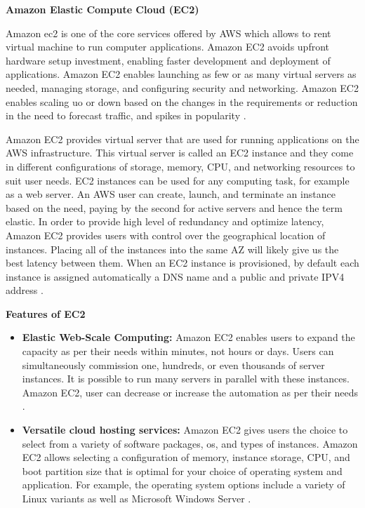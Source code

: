 \textbf{Amazon Elastic Compute Cloud (EC2)}

\par Amazon \gls{ec2} is one of the core services offered by
AWS
which
allows to rent virtual machine to run computer
applications. Amazon EC2 avoids upfront hardware setup investment, enabling faster development and deployment of applications. Amazon EC2 enables launching as few or as many virtual servers as needed, managing storage, and configuring security and networking. Amazon EC2 enables scaling uo or down based on the changes in the requirements or reduction in the need to forecast traffic, and spikes in popularity \cite{29}.

\par Amazon EC2 provides virtual server that are used for
running applications on the AWS infrastructure. This
virtual server is called an EC2 instance and they come in different configurations of storage, memory, CPU, and networking resources to suit user needs. EC2 instances can be used for any computing task, for example as a web server. An AWS user can create, launch, and terminate an instance based on the need, paying by the second for active servers and hence the term elastic. In order to provide high level of redundancy and optimize latency, Amazon EC2 provides users with control over the geographical location of instances. Placing all of the instances into the same AZ will likely give us the best latency between them. When an EC2 instance is provisioned, by default each instance is assigned automatically a DNS name and a public and private IPV4 address \cite{30}.


\textbf{Features of EC2}
\begin{itemize}
    \item \textbf{Elastic Web-Scale Computing:} Amazon EC2 enables users to expand the capacity as per their needs within minutes, not hours or days.
    Users can simultaneously commission one, hundreds, or even thousands of server instances.
    It is possible to run many servers in
    parallel
    with these instances.
    Amazon EC2, user can decrease or increase the
    automation as per their needs \cite{31}.
\end{itemize}

\begin{itemize}
    \item \textbf{Versatile cloud hosting services:} Amazon EC2 gives users the choice to select from a variety of software packages, os, and types of instances.
    Amazon EC2 allows selecting a configuration of memory, instance storage, CPU, and boot partition size that is optimal for your choice of operating system and application. For example, the operating system options include a variety of Linux variants as well as Microsoft Windows Server \cite{29}.
\end{itemize}

